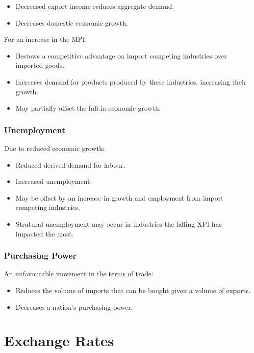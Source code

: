 \documentclass[a4paper,11pt]{report}
\begin{document}
\begin{itemize}
\item Decreased export income reduces aggregate demand.
\item Decreases domestic economic growth.
\end{itemize}

For an increase in the MPI:

\begin{itemize}
\item Bestows a competitive advantage on import competing industries over
	imported goods.
\item Increases demand for products produced by these industries, increasing
	their growth.
\item May partially offset the fall in economic growth.
\end{itemize}

\subsection{Unemployment}

Due to reduced economic growth:

\begin{itemize}
\item Reduced derived demand for labour.
\item Increased unemployment.
\item May be offset by an increase in growth and employment from import
	competing industries.
\item Strutural unemployment may occur in industries the falling XPI has
	impacted the most.
\end{itemize}

\subsection{Purchasing Power}

An unfavourable movement in the terms of trade:

\begin{itemize}
\item Reduces the volume of imports that can be bought given a volume of
	exports.
\item Decreases a nation's purchasing power.
\end{itemize}




\chapter{Exchange Rates}
\end{document}
